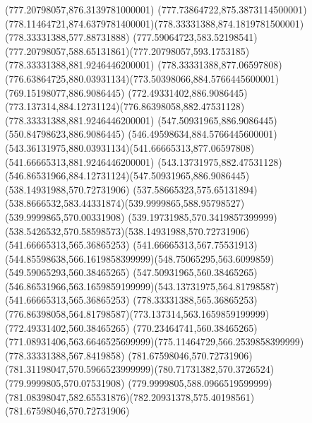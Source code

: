 {{	\closepath
	\moveto(777.20798057,876.3139781000001)
	\curveto(777.73864722,875.3873114500001)(778.11464721,874.6379781400001)(778.33331388,874.1819781500001)
	\lineto(778.33331388,577.88731888)
	\curveto(777.59064723,583.52198541)(777.20798057,588.65131861)(777.20798057,593.1753185)
	\closepath
	\moveto(778.33331388,881.9246446200001)
	\lineto(778.33331388,877.06597808)
	\curveto(776.63864725,880.03931134)(773.50398066,884.5766445600001)(769.15198077,886.9086445)
	\lineto(772.49331402,886.9086445)
	\curveto(773.137314,884.12731124)(776.86398058,882.47531128)(778.33331388,881.9246446200001)
	\moveto(547.50931965,886.9086445)
	\lineto(550.84798623,886.9086445)
	\curveto(546.49598634,884.5766445600001)(543.36131975,880.03931134)(541.66665313,877.06597808)
	\lineto(541.66665313,881.9246446200001)
	\curveto(543.13731975,882.47531128)(546.86531966,884.12731124)(547.50931965,886.9086445)
	\moveto(538.14931988,570.72731906)
	\curveto(537.58665323,575.65131894)(538.8666532,583.44331874)(539.9999865,588.95798527)
	\lineto(539.9999865,570.00331908)
	\curveto(539.19731985,570.3419857399999)(538.5426532,570.58598573)(538.14931988,570.72731906)
	\moveto(541.66665313,565.36865253)
	\lineto(541.66665313,567.75531913)
	\curveto(544.85598638,566.1619858399999)(548.75065295,563.6099859)(549.59065293,560.38465265)
	\lineto(547.50931965,560.38465265)
	\curveto(546.86531966,563.1659859199999)(543.13731975,564.81798587)(541.66665313,565.36865253)
	\moveto(778.33331388,565.36865253)
	\curveto(776.86398058,564.81798587)(773.137314,563.1659859199999)(772.49331402,560.38465265)
	\lineto(770.23464741,560.38465265)
	\curveto(771.08931406,563.6646525699999)(775.11464729,566.2539858399999)(778.33331388,567.8419858)
	\closepath
	\moveto(781.67598046,570.72731906)
	\curveto(781.31198047,570.5966523999999)(780.71731382,570.3726524)(779.9999805,570.07531908)
	\lineto(779.9999805,588.0966519599999)
	\curveto(781.08398047,582.65531876)(782.20931378,575.40198561)(781.67598046,570.72731906)
}
}
